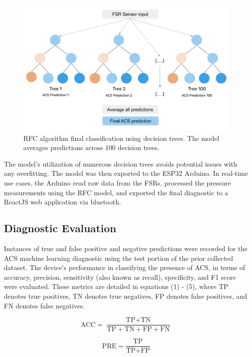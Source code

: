 \documentclass[times, twoside]{zHenriquesLab-StyleBioRxiv}
\begin{document}
\begin{figure}[H] %
    \centering
    \includegraphics[width=1\linewidth]{RFC_diagram.png}
    \caption{RFC algorithm final classification using decision trees. The model averages predictions across 100 decision trees.}
    \label{fig:treeDiagram}
\end{figure}

The model’s utilization of numerous decision trees avoids potential issues with any overfitting. The model was then exported to the ESP32 Arduino. In real-time use cases, the Arduino read raw data from the FSRs, processed the pressure measurements using the RFC model, and exported the final diagnostic to a ReactJS web application via bluetooth. 

\subsection*{Diagnostic Evaluation}
Instances of true and false positive and negative predictions were recorded for the ACS machine learning diagnostic using the test portion of the prior collected dataset. The device’s performance in classifying the presence of ACS, in terms of accuracy, precision, sensitivity (also known as recall), specificity, and F1 score were evaluated. These metrics are detailed in equations (1) - (5), where TP denotes true positives, TN denotes true negatives, FP denotes false positives, and FN denotes false negatives.

\begin{equation}
\text{ACC} = \frac{\text{TP} + \text{TN}}{\text{TP} + \text{TN} + \text{FP} + \text{FN}}
\end{equation}

\begin{equation}
\text{PRE} = \frac{\text{TP}}{\text{TP} + \text{FP}}
\end{equation}
\end{document}
